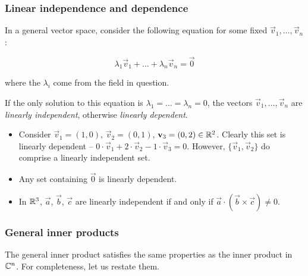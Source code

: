 \documentclass{../../template/note}
\begin{document}
    \subsubsection{Linear independence and dependence}
    
    In a general vector space, consider the following equation for some fixed \(\vec v_1, \dots, \vec v_n\):
    
    \[
        \lambda_1 \vec v_1 + \dots + \lambda_n \vec v_n = \vec 0
    \]
    
    where the \(\lambda_i\) come from the field in question.

    \begin{definition}
        If the only solution to this equation is \(\lambda_1 = \dots = \lambda_n = 0\), the vectors \(\vec v_1, \dots, \vec v_n\) are \emph{linearly independent}, otherwise \emph{linearly dependent}.
    \end{definition}
    
    \begin{example}
        \begin{itemize}
            \item Consider \(\vec v_1 = (1, 0)\), \(\vec v_2 = (0, 1)\), \(\vec v_3 = (0, 2) \in \RR^2\). Clearly this set is linearly dependent -- \(0 \cdot \vec v_1 + 2 \cdot \vec v_2 - 1 \cdot \vec v_3 = 0\). However, \(\{\vec v_1, \vec v_2\}\) do comprise a linearly independent set.
            \item Any set containing \(\vec 0\) is linearly dependent.
            \item In \(\mathbb R^3\), \(\vec a\), \(\vec b\), \(\vec c\) are linearly independent if and only if \(\vec a \cdot (\vec b \times \vec c) \neq 0\).
        \end{itemize}
    \end{example}
    
    \subsubsection{General inner products}

    The general inner product satisfies the same properties as the inner product in \(\mathbb C^n\). For completeness, let us restate them.
\end{document}
